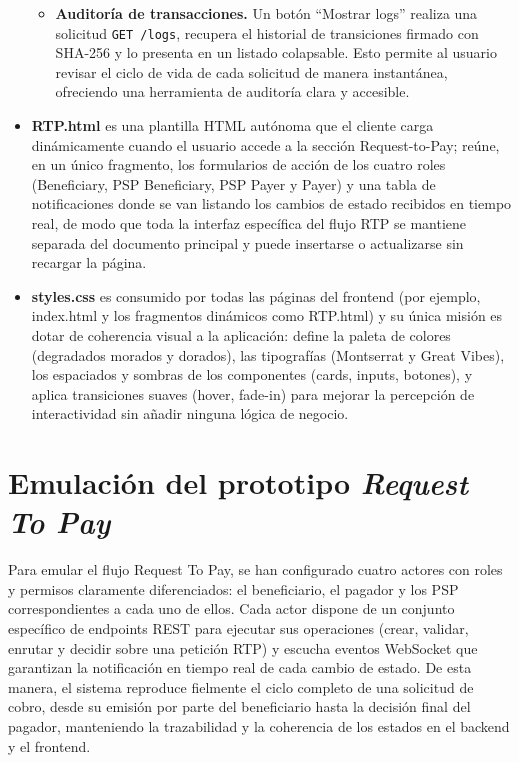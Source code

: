 \begin{itemize}
\begin{itemize}
            \item \textbf{Auditoría de transacciones.} Un botón ``Mostrar logs'' realiza una solicitud \texttt{GET /logs}, recupera el historial de transiciones firmado con SHA-256 y lo presenta en un listado colapsable. Esto permite al usuario revisar el ciclo de vida de cada solicitud de manera instantánea, ofreciendo una herramienta de auditoría clara y accesible.
        \end{itemize}

    \item \textbf{RTP.html} es una plantilla HTML autónoma que el cliente carga dinámicamente cuando el usuario accede a la sección Request-to-Pay; reúne, en un único fragmento, los formularios de acción de los cuatro roles (Beneficiary, PSP Beneficiary, PSP Payer y Payer) y una tabla de notificaciones donde se van listando los cambios de estado recibidos en tiempo real, de modo que toda la interfaz específica del flujo RTP se mantiene separada del documento principal y puede insertarse o actualizarse sin recargar la página.
    \item \textbf{styles.css} es consumido por todas las páginas del frontend (por ejemplo, index.html y los fragmentos dinámicos como RTP.html) y su única misión es dotar de coherencia visual a la aplicación: define la paleta de colores (degradados morados y dorados), las tipografías (Montserrat y Great Vibes), los espaciados y sombras de los componentes (cards, inputs, botones), y aplica transiciones suaves (hover, fade-in) para mejorar la percepción de interactividad sin añadir ninguna lógica de negocio. 
\end{itemize}

\section{Emulación del prototipo \textit{Request To Pay}}
\label{subsec:EmulacionRTP}
Para emular el flujo Request To Pay, se han configurado cuatro actores con roles y permisos claramente diferenciados: el beneficiario, el pagador y los PSP correspondientes a cada uno de ellos. Cada actor dispone de un conjunto específico de endpoints REST para ejecutar sus operaciones (crear, validar, enrutar y decidir sobre una petición RTP) y escucha eventos WebSocket que garantizan la notificación en tiempo real de cada cambio de estado. De esta manera, el sistema reproduce fielmente el ciclo completo de una solicitud de cobro, desde su emisión por parte del beneficiario hasta la decisión final del pagador, manteniendo la trazabilidad y la coherencia de los estados en el backend y el frontend.

